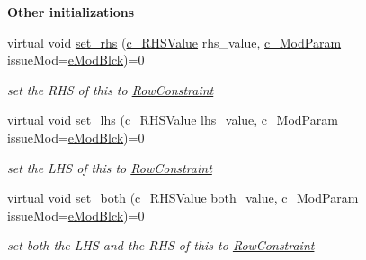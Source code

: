 \begin{Indent}\textbf{ Other initializations}\par
\begin{DoxyCompactItemize}
\item 
virtual void \mbox{\hyperlink{class_s_m_spp__di__unipi__it_1_1_row_constraint_a42d5ec40966a094c7fa805a5ea44337b}{set\+\_\+rhs}} (\mbox{\hyperlink{class_s_m_spp__di__unipi__it_1_1_row_constraint_a34abd4b01d3a2024be5f6d13dd88779f}{c\+\_\+\+R\+H\+S\+Value}} rhs\+\_\+value, \mbox{\hyperlink{group___modification___t_y_p_e_s_ga544246d8c462e9a2d817c2c30797968f}{c\+\_\+\+Mod\+Param}} issue\+Mod=\mbox{\hyperlink{group___modification___t_y_p_e_s_gga48fddcdd03a03f49b7e389ca1ed938d4a21b14b26b1c0093a0905f6fc010bad29}{e\+Mod\+Blck}})=0
\begin{DoxyCompactList}\small\item\em set the R\+HS of this to \mbox{\hyperlink{class_s_m_spp__di__unipi__it_1_1_row_constraint}{Row\+Constraint}} \end{DoxyCompactList}\item 
virtual void \mbox{\hyperlink{class_s_m_spp__di__unipi__it_1_1_row_constraint_a1e707449bc5e308a84fbb17197e184a6}{set\+\_\+lhs}} (\mbox{\hyperlink{class_s_m_spp__di__unipi__it_1_1_row_constraint_a34abd4b01d3a2024be5f6d13dd88779f}{c\+\_\+\+R\+H\+S\+Value}} lhs\+\_\+value, \mbox{\hyperlink{group___modification___t_y_p_e_s_ga544246d8c462e9a2d817c2c30797968f}{c\+\_\+\+Mod\+Param}} issue\+Mod=\mbox{\hyperlink{group___modification___t_y_p_e_s_gga48fddcdd03a03f49b7e389ca1ed938d4a21b14b26b1c0093a0905f6fc010bad29}{e\+Mod\+Blck}})=0
\begin{DoxyCompactList}\small\item\em set the L\+HS of this to \mbox{\hyperlink{class_s_m_spp__di__unipi__it_1_1_row_constraint}{Row\+Constraint}} \end{DoxyCompactList}\item 
virtual void \mbox{\hyperlink{class_s_m_spp__di__unipi__it_1_1_row_constraint_abe9589ef7ede6b4d5b0c0a1cbe72b5b7}{set\+\_\+both}} (\mbox{\hyperlink{class_s_m_spp__di__unipi__it_1_1_row_constraint_a34abd4b01d3a2024be5f6d13dd88779f}{c\+\_\+\+R\+H\+S\+Value}} both\+\_\+value, \mbox{\hyperlink{group___modification___t_y_p_e_s_ga544246d8c462e9a2d817c2c30797968f}{c\+\_\+\+Mod\+Param}} issue\+Mod=\mbox{\hyperlink{group___modification___t_y_p_e_s_gga48fddcdd03a03f49b7e389ca1ed938d4a21b14b26b1c0093a0905f6fc010bad29}{e\+Mod\+Blck}})=0
\begin{DoxyCompactList}\small\item\em set both the L\+HS and the R\+HS of this to \mbox{\hyperlink{class_s_m_spp__di__unipi__it_1_1_row_constraint}{Row\+Constraint}} \end{DoxyCompactList}\item 

\end{DoxyCompactItemize}
\end{Indent}
